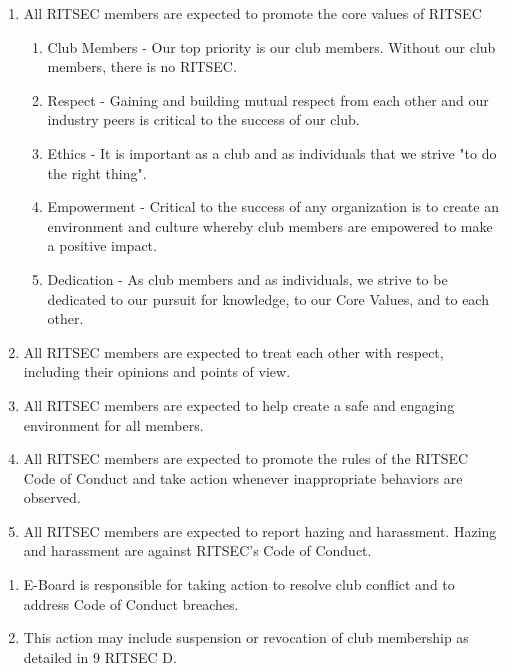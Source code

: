 


\begin{enumerate}
  \item All RITSEC members are expected to promote the core values of RITSEC
  \begin{enumerate}
    \item Club Members - Our top priority is our club members. Without our club
      members, there is no RITSEC.
    \item Respect - Gaining and building mutual respect from each other and our
      industry peers is critical to the success of our club.
    \item Ethics - It is important as a club and as individuals that we strive
      "to do the right thing".
    \item Empowerment - Critical to the success of any organization is to
      create an environment and culture whereby club members are empowered to
      make a positive impact.
    \item Dedication - As club members and as individuals, we strive to be
      dedicated to our pursuit for knowledge, to our Core Values, and to each
      other.
  \end{enumerate}
  \item All RITSEC members are expected to treat each other with respect,
    including their opinions and points of view.
  \item All RITSEC members are expected to help create a safe and engaging
    environment for all members.
  \item All RITSEC members are expected to promote the rules of the RITSEC Code
    of Conduct and take action whenever inappropriate behaviors are observed.
  \item All RITSEC members are expected to report hazing and harassment. Hazing
    and harassment are against RITSEC’s Code of Conduct.
\end{enumerate}


\begin{enumerate}
  \item E-Board is responsible for taking action to resolve club conflict and
    to address Code of Conduct breaches.
  \item This action may include suspension or revocation of club membership as
    detailed in 9 RITSEC D.
\end{enumerate}


